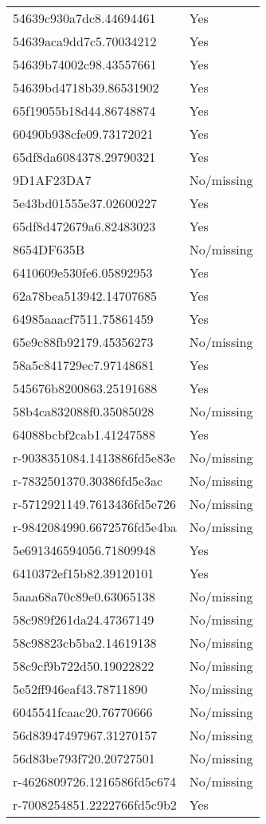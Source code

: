 \begin{tabular}{ll}
54639c930a7dc8.44694461 & Yes \\
54639aca9dd7c5.70034212 & Yes \\
54639b74002c98.43557661 & Yes \\
54639bd4718b39.86531902 & Yes \\
65f19055b18d44.86748874 & Yes \\
60490b938cfe09.73172021 & Yes \\
65df8da6084378.29790321 & Yes \\
9D1AF23DA7 & No/missing \\
5e43bd01555e37.02600227 & Yes \\
65df8d472679a6.82483023 & Yes \\
8654DF635B & No/missing \\
6410609e530fe6.05892953 & Yes \\
62a78bea513942.14707685 & Yes \\
64985aaacf7511.75861459 & Yes \\
65e9c88fb92179.45356273 & No/missing \\
58a5c841729ec7.97148681 & Yes \\
545676b8200863.25191688 & Yes \\
58b4ca832088f0.35085028 & No/missing \\
64088bcbf2cab1.41247588 & Yes \\
r-9038351084.1413886fd5e83e & No/missing \\
r-7832501370.30386fd5e3ac & No/missing \\
r-5712921149.7613436fd5e726 & No/missing \\
r-9842084990.6672576fd5e4ba & No/missing \\
5e691346594056.71809948 & Yes \\
6410372ef15b82.39120101 & Yes \\
5aaa68a70c89e0.63065138 & No/missing \\
58c989f261da24.47367149 & No/missing \\
58c98823cb5ba2.14619138 & No/missing \\
58c9cf9b722d50.19022822 & No/missing \\
5e52ff946eaf43.78711890 & No/missing \\
6045541fcaac20.76770666 & No/missing \\
56d83947497967.31270157 & No/missing \\
56d83be793f720.20727501 & No/missing \\
r-4626809726.1216586fd5c674 & No/missing \\
r-7008254851.2222766fd5c9b2 & Yes \\

\end{tabular}
